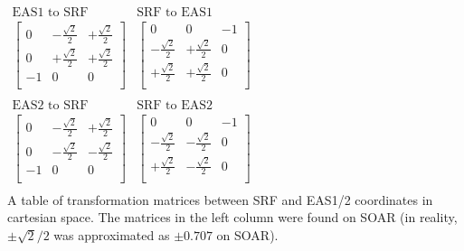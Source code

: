 \begin{table}[h!]
    \centering
    \(
    \begin{array}{cc}
        \text{EAS1 to SRF} & \text{SRF to EAS1} \\
        \begin{bmatrix}
        0 & -\frac{\sqrt{2}}{2} & +\frac{\sqrt{2}}{2}\\
        0 & +\frac{\sqrt{2}}{2} & +\frac{\sqrt{2}}{2}\\
        -1 & 0 & 0\\
        \end{bmatrix} &
        \begin{bmatrix}
        0 & 0 & -1\\
        -\frac{\sqrt{2}}{2} & +\frac{\sqrt{2}}{2} & 0\\
        +\frac{\sqrt{2}}{2} & +\frac{\sqrt{2}}{2} & 0\\
        \end{bmatrix}
        \\
        \\
        \text{EAS2 to SRF} & \text{SRF to EAS2} \\
        \begin{bmatrix}
        0 & -\frac{\sqrt{2}}{2} & +\frac{\sqrt{2}}{2}\\
        0 & -\frac{\sqrt{2}}{2} & -\frac{\sqrt{2}}{2}\\
        -1 & 0 & 0\\
        \end{bmatrix} &
        \begin{bmatrix}
        0 & 0 & -1\\
        -\frac{\sqrt{2}}{2} & -\frac{\sqrt{2}}{2} & 0\\
        +\frac{\sqrt{2}}{2} & -\frac{\sqrt{2}}{2} & 0\\
        \end{bmatrix}
        \\
        
    \end{array}
    \)\\
    \caption{A table of transformation matrices between SRF and EAS1/2 coordinates in cartesian space. The matrices in the left column were found on SOAR (in reality, \(\pm\sqrt{2}/2\) was approximated as \(\pm0.707\) on SOAR).} 
    \label{tab: EASX to SRF}
\end{table}


